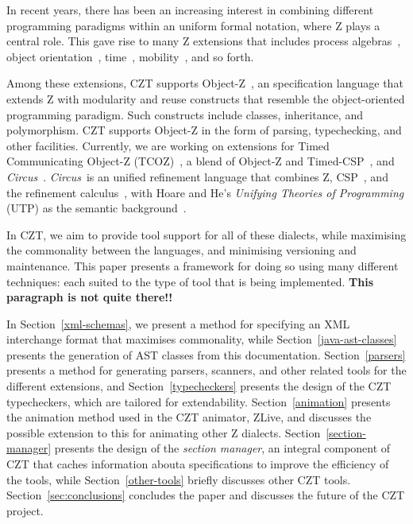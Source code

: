 \documentclass{llncs}
\newcommand{\Circus}{{\sf\slshape Circus}}
\begin{document}
  In recent years, there has been an increasing interest in combining
  different programming paradigms within an uniform formal notation,
  where Z plays a central role. This gave rise to many Z extensions that
  includes process algebras~\cite{fischer-1998,fischer-2000,circus.sem:intro},
  object orientation~\cite{oz,ohcircus}, time~\cite{tcoz,circus.sem:real.time2},
  mobility~\cite{circus.sem:mobility}, and so forth.

  Among these extensions, CZT supports Object-Z~\cite{oz}, an
  specification language that extends Z with modularity and reuse
  constructs that resemble the object-oriented programming
  paradigm. Such constructs include classes, inheritance, and
  polymorphism. CZT supports Object-Z in the form of parsing,
  typechecking, and other facilities.  Currently, we are working on
  extensions for Timed Communicating Object-Z (TCOZ)~\cite{tcoz}, a
  blend of Object-Z and Timed-CSP~\cite{timed-csp}, and
  \Circus~\cite{circus.sem:intro}.  \Circus\ is an unified refinement
  language that combines Z, CSP~\cite{csp.books:roscoe}, and the
  refinement calculus~\cite{fm.ref:morgan}, with Hoare and He's
  \textit{Unifying Theories of Programming} (UTP) as the semantic
  background~\cite{hoare.utp}.

  In CZT, we aim to provide tool support for all of these dialects,
  while maximising the commonality between the languages, and
  minimising versioning and maintenance. This paper presents a
  framework for doing so using many different techniques: each suited
  to the type of tool that is being implemented. {\bf This paragraph is
  not quite there!!}

  In Section~\ref{xml-schemas}, we present a method for specifying an
  XML interchange format that maximises commonality, while
  Section~\ref{java-ast-classes} presents the generation of AST
  classes from this documentation. Section~\ref{parsers} presents a
  method for generating parsers, scanners, and other related tools for
  the different extensions, and Section~\ref{typecheckers} presents
  the design of the CZT typecheckers, which are tailored for
  extendability. Section~\ref{animation} presents the animation method
  used in the CZT animator, ZLive, and discusses the possible
  extension to this for animating other Z
  dialects. Section~\ref{section-manager} presents the design of the
  {\em section manager}, an integral component of CZT that caches
  information abouta specifications to improve the efficiency of the
  tools, while Section~\ref{other-tools} briefly discusses other CZT
  tools. Section~\ref{sec:conclusions} concludes the paper and
  discusses the future of the CZT project.
\end{document}
